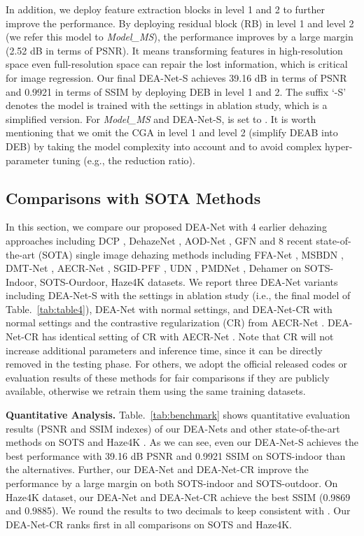 \documentclass[lettersize,journal]{IEEEtran}
\begin{document}
In addition, we deploy feature extraction blocks in level 1 and 2 to further improve the performance.
By deploying residual block (RB) in level 1 and level 2 (we refer this model to \textit{Model\_MS}), the performance improves by a large margin (2.52 dB in terms of PSNR).
It means transforming features in high-resolution space even full-resolution space can repair the lost information, which is critical for image regression.
Our final DEA-Net-S achieves 39.16 dB in terms of PSNR and 0.9921 in terms of SSIM by deploying DEB in level 1 and 2.
The suffix `-S' denotes the model is trained with the settings in ablation study, which is a simplified version.
For \textit{Model\_MS} and DEA-Net-S,  is set to .
It is worth mentioning that we omit the CGA in level 1 and level 2 (simplify DEAB into DEB) by taking the model complexity into account and to avoid complex hyper-parameter tuning (e.g., the reduction ratio).

\subsection{Comparisons with SOTA Methods}


In this section, we compare our proposed DEA-Net with 4 earlier dehazing approaches including DCP \cite{he2010TPAMI}, DehazeNet \cite{cai2016TIP}, AOD-Net \cite{li2017ICCV}, GFN \cite{ren2018CVPR} and 8 recent state-of-the-art (SOTA) single image dehazing methods including FFA-Net \cite{qin2020AAAI}, MSBDN \cite{dong2020CVPR}, DMT-Net \cite{liu2021ACMMM}, AECR-Net \cite{wu2021CVPR}, SGID-PFF \cite{bai2022TIP}, UDN \cite{hong2022AAAI}, PMDNet \cite{ye2022ECCVORAL}, Dehamer \cite{guo2022CVPR} on SOTS-Indoor, SOTS-Ourdoor, Haze4K datasets.
We report three DEA-Net variants including DEA-Net-S with the settings in ablation study (i.e., the final model of Table.~\ref{tab:table4}), DEA-Net with normal settings, and DEA-Net-CR with normal settings and the contrastive regularization (CR) from AECR-Net \cite{wu2021CVPR}.
DEA-Net-CR has identical setting of CR with AECR-Net \cite{wu2021CVPR}.
Note that CR will not increase additional parameters and inference time, since it can be directly removed in the testing phase.
For others, we adopt the official released codes or evaluation results of these methods for fair comparisons if they are publicly available, otherwise we retrain them using the same training datasets.

\textbf{Quantitative Analysis.}
Table.~\ref{tab:benchmark} shows quantitative evaluation results (PSNR and SSIM indexes) of our DEA-Nets and other state-of-the-art methods on SOTS \cite{li2018TIP} and Haze4K \cite{liu2021ACMMM}.
As we can see, even our DEA-Net-S achieves the best performance with 39.16 dB PSNR and 0.9921 SSIM on SOTS-indoor than the alternatives.
Further, our DEA-Net and DEA-Net-CR improve the performance by a large margin on both SOTS-indoor and SOTS-outdoor.
On Haze4K dataset, our DEA-Net and DEA-Net-CR achieve the best SSIM (0.9869 and 0.9885). 
We round the results to two decimals to keep consistent with \cite{liu2021ACMMM}.
Our DEA-Net-CR ranks first in all comparisons on SOTS and Haze4K.
\end{document}
